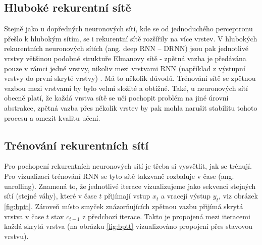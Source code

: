 

\subsection{Hluboké rekurentní sítě}

Stejně jako u dopředných neuronových sítí, kde se od jednoduchého perceptronu
přešlo k hlubokým sítím, se i rekurentní sítě rozšířily na více vrstev. V
hlubokých rekurentních neuronových sítích (ang. deep RNN – DRNN) jsou pak
jednotlivé vrstvy většinou podobné struktuře Elmanovy sítě \cite{elman} -
zpětná vazba je předávána pouze v rámci jedné vrstvy, nikoliv mezi vrstvami RNN
(například z výstupní vrstvy do první skryté vrstvy) \cite{deeprnn}. Má to
několik důvodů. Trénování sítě se zpětnou vazbou mezi vrstvami by bylo velmi
složité a obtížné. Také, u neuronových sítí obecně platí, že každá vrstva sítě
se učí pochopit problém na jiné úrovni abstrakce, zpětná vazba přes několik
vrstev by pak mohla narušit stabilitu tohoto procesu a omezit kvalitu učení.

\subsection{Trénování rekurentních sítí}

Pro pochopení rekurentních neuronových sítí je třeba si vysvětlit, jak se
trénují. Pro vizualizaci trénování RNN se tyto sítě takzvaně rozbaluje v čase
(ang. unrolling). Znamená to, že jednotlivé iterace vizualizujeme jako sekvenci
stejných sítí (stejné váhy), které v čase $t$ přijímají vstup $x_t$ a vracejí
výstup $y_t$, viz obrázek \ref{fig:bptt}. Zároveň místo smyček znázorňujících
zpětnou vazbu přijímá skrytá vrstva v čase $t$ stav $c_{t-1}$ z předchozí
iterace. Takto je propojená mezi iteracemi každá skrytá vrstva (na obrázku
\ref{fig:bptt} vizualizováno propojení přes stavovou vrstvu).

